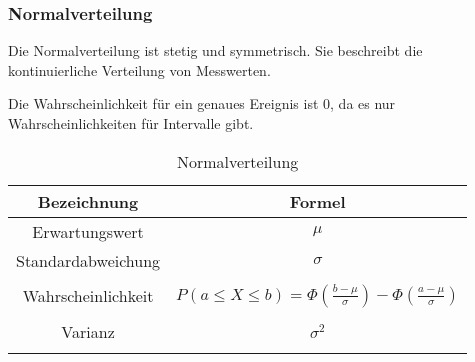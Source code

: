 \documentclass[12pt]{scrartcl}
\begin{document}
\pagebreak

\subsubsection{Normalverteilung}

Die Normalverteilung ist stetig und symmetrisch.
Sie beschreibt die kontinuierliche Verteilung von Messwerten.\par
Die Wahrscheinlichkeit für ein genaues Ereignis ist 0,
da es nur Wahrscheinlichkeiten für Intervalle gibt.

\begin{table}[h]
    \begin{tabular}{ | c | c | }
        \hline
        Bezeichnung        & Formel                                                                         \\
        \hline
        Erwartungswert     & $\mu$                                                                          \\
        Standardabweichung & $\sigma$                                                                       \\
        \hline             &                                                                                \\
        Wahrscheinlichkeit & $P(a \leq X \leq b) = \Phi(\frac{b-\mu}{\sigma}) - \Phi(\frac{a-\mu}{\sigma})$ \\&\\
        Varianz            & $\sigma^2$                                                                     \\&\\
        \hline
    \end{tabular}
    \caption{Normalverteilung}
\end{table}
\end{document}
